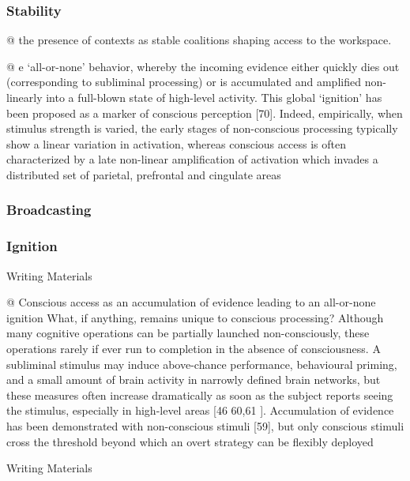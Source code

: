 \documentclass[utf8]{article}
\newenvironment{ants}
			{
			 \begin{easylist}[itemize]		
		 	}
			{
			\end{easylist}
			}
\newenvironment{writingMaterials}
			{	
				\begin{tcolorbox}[size=small, colframe=black!20!white, toprule=1mm]
					Writing Materials
				\end{tcolorbox}

				\begin{easylist}[itemize]		
			}
			{
				\end{easylist}
				\begin{tcolorbox}[size=small, bottomrule=1mm, halign=flush right, colframe=black!20!white]
					Writing Materials
				\end{tcolorbox}			
			}
\begin{document}
			\subsubsection{Stability}
				\begin{ants}
					@ the presence of contexts as stable coalitions shaping access to the workspace.
					
					@ e ‘all-or-none’ behavior, whereby the incoming evidence either quickly dies out (corresponding to subliminal processing) or is accumulated and ampliﬁed non-linearly into a full-blown state of high-level activity. This global ‘ignition’ has been proposed as a marker of conscious perception [70]. Indeed, empirically, when stimulus strength is varied, the early stages of non-conscious processing typically show a linear variation in activation, whereas conscious access is often characterized by a late non-linear ampliﬁcation of activation which invades a distributed set of parietal, prefrontal and cingulate areas
				\end{ants}
			
			
			\subsubsection{Broadcasting}
			
			
			
			
			\subsubsection{Ignition}
				\begin{writingMaterials}
					@ Conscious access as an accumulation of evidence leading to an all-or-none ignition What, if anything, remains unique to conscious processing? Although many cognitive operations can be partially launched non-consciously, these operations rarely if ever run to completion in the absence of consciousness. A subliminal stimulus may induce above-chance performance, behavioural priming, and a small amount of brain activity in narrowly deﬁned brain networks, but these measures often increase dramatically as soon as the subject reports seeing the stimulus, especially in high-level areas [46 60,61  ]. Accumulation of evidence has been demonstrated with non-conscious stimuli [59], but only conscious stimuli cross the threshold beyond which an overt strategy can be ﬂexibly deployed
				\end{writingMaterials}
				
				
				
\end{document}
